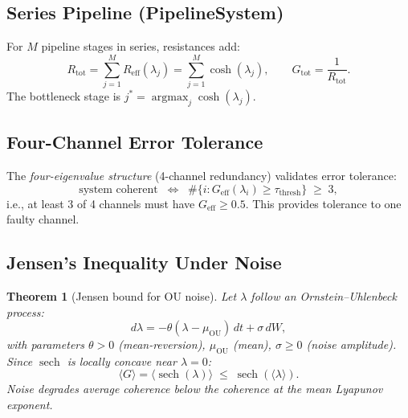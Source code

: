 \documentclass[12pt,a4paper]{article}
\theoremstyle{plain}
\newtheorem{theorem}{Theorem}[section]
\theoremstyle{definition}
\theoremstyle{remark}
\newcommand{\Geff}{G_{\mathrm{eff}}}
\newcommand{\Reff}{R_{\mathrm{eff}}}
\begin{document}
\subsection{Series Pipeline (PipelineSystem)}

For $M$ pipeline stages in series, resistances add:
\begin{equation}
  R_{\mathrm{tot}} = \sum_{j=1}^{M} \Reff(\lambda_j)
                   = \sum_{j=1}^{M} \cosh(\lambda_j),\qquad
  G_{\mathrm{tot}} = \frac{1}{R_{\mathrm{tot}}}.
  \label{eq:series}
\end{equation}
The bottleneck stage is $j^* = \operatorname{argmax}_j \cosh(\lambda_j)$.

\subsection{Four-Channel Error Tolerance}

The \emph{four-eigenvalue structure} (4-channel redundancy) validates error
tolerance:
\begin{equation}
  \text{system coherent}
  \;\;\Leftrightarrow\;\;
  \#\bigl\{i : \Geff(\lambda_i) \ge \tau_{\mathrm{thresh}}\bigr\} \;\ge\; 3,
  \label{eq:4channel}
\end{equation}
i.e., at least 3 of 4 channels must have $\Geff \ge 0.5$.  This provides
tolerance to one faulty channel.

\subsection{Jensen's Inequality Under Noise}

\begin{theorem}[Jensen bound for OU noise]\label{thm:jensen}
  Let $\lambda$ follow an Ornstein--Uhlenbeck process:
  \begin{equation}
    d\lambda = -\theta(\lambda - \mu_{\mathrm{OU}})\,dt + \sigma\,dW,
    \label{eq:ou-sde}
  \end{equation}
  with parameters $\theta>0$ (mean-reversion), $\mu_{\mathrm{OU}}$ (mean),
  $\sigma\ge0$ (noise amplitude).  Since $\operatorname{sech}$ is locally
  concave near $\lambda = 0$:
  \begin{equation}
    \langle G\rangle = \langle\operatorname{sech}(\lambda)\rangle
    \;\le\; \operatorname{sech}(\langle\lambda\rangle).
    \label{eq:jensen}
  \end{equation}
  Noise \emph{degrades} average coherence below the coherence at the mean
  Lyapunov exponent.
\end{theorem}
\end{document}

